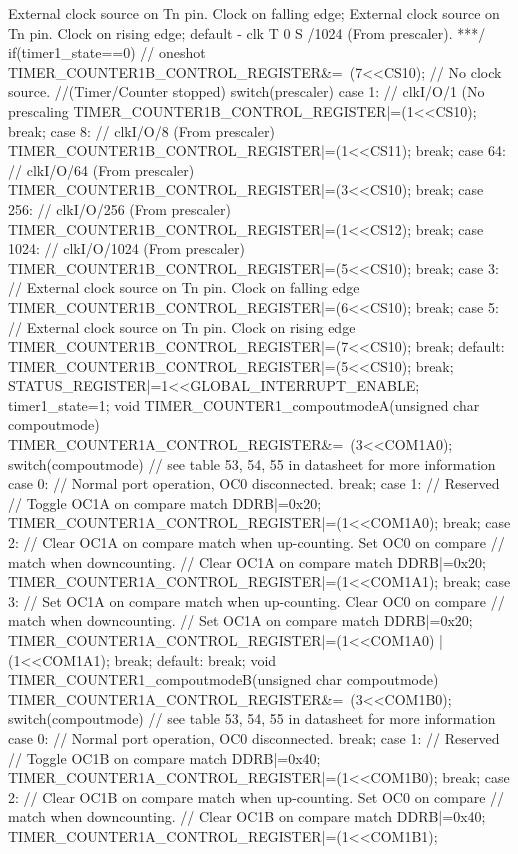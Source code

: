 \begin{verbatimtab}
External clock source on Tn pin. Clock on falling edge;
External clock source on Tn pin. Clock on rising edge;
default - clk T 0 S /1024 (From prescaler).
***/
{
	if(timer1_state==0){ // oneshot
		TIMER_COUNTER1B_CONTROL_REGISTER&=~(7<<CS10); // No clock source.
		//(Timer/Counter stopped)
		switch(prescaler){
			case 1: // clkI/O/1 (No prescaling
			TIMER_COUNTER1B_CONTROL_REGISTER|=(1<<CS10);
			break;
			case 8: // clkI/O/8 (From prescaler)
			TIMER_COUNTER1B_CONTROL_REGISTER|=(1<<CS11);
			break;
			case 64: // clkI/O/64 (From prescaler)
			TIMER_COUNTER1B_CONTROL_REGISTER|=(3<<CS10);
			break;
			case 256: // clkI/O/256 (From prescaler)
			TIMER_COUNTER1B_CONTROL_REGISTER|=(1<<CS12);
			break;
			case 1024: // clkI/O/1024 (From prescaler)
			TIMER_COUNTER1B_CONTROL_REGISTER|=(5<<CS10);
			break;
			case 3: // External clock source on Tn pin. Clock on falling edge
			TIMER_COUNTER1B_CONTROL_REGISTER|=(6<<CS10);
			break;
			case 5: // External clock source on Tn pin. Clock on rising edge
			TIMER_COUNTER1B_CONTROL_REGISTER|=(7<<CS10);
			break;
			default:
			TIMER_COUNTER1B_CONTROL_REGISTER|=(5<<CS10);
			break;
		}
		STATUS_REGISTER|=1<<GLOBAL_INTERRUPT_ENABLE;
		timer1_state=1;
	}	
}
void TIMER_COUNTER1_compoutmodeA(unsigned char compoutmode)
{
	TIMER_COUNTER1A_CONTROL_REGISTER&=~(3<<COM1A0);
	switch(compoutmode){ // see table 53, 54, 55 in datasheet for more information
		case 0: // Normal port operation, OC0 disconnected.
		break;
		case 1: // Reserved
		// Toggle OC1A on compare match
		DDRB|=0x20;
		TIMER_COUNTER1A_CONTROL_REGISTER|=(1<<COM1A0);
		break;
		case 2: // Clear OC1A on compare match when up-counting. Set OC0 on compare
		// match when downcounting.
		// Clear OC1A on compare match
		DDRB|=0x20;
		TIMER_COUNTER1A_CONTROL_REGISTER|=(1<<COM1A1);
		break;
		case 3: // Set OC1A on compare match when up-counting. Clear OC0 on compare
		// match when downcounting.
		// Set OC1A on compare match
		DDRB|=0x20;
		TIMER_COUNTER1A_CONTROL_REGISTER|=(1<<COM1A0) | (1<<COM1A1);
		break;
		default:
		break;
	}
}
void TIMER_COUNTER1_compoutmodeB(unsigned char compoutmode)
{
	TIMER_COUNTER1A_CONTROL_REGISTER&=~(3<<COM1B0);
	switch(compoutmode){ // see table 53, 54, 55 in datasheet for more information
		case 0: // Normal port operation, OC0 disconnected.
		break;
		case 1: // Reserved
		// Toggle OC1B on compare match
		DDRB|=0x40;
		TIMER_COUNTER1A_CONTROL_REGISTER|=(1<<COM1B0);
		break;
		case 2: // Clear OC1B on compare match when up-counting. Set OC0 on compare
		// match when downcounting.
		// Clear OC1B on compare match
		DDRB|=0x40;
		TIMER_COUNTER1A_CONTROL_REGISTER|=(1<<COM1B1);
}}
\end{verbatimtab}
